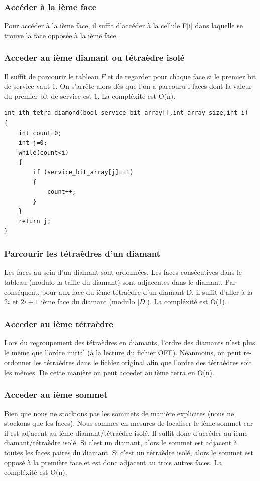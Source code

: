 \documentclass[a4paper,11pt,openany]{article}
\begin{document}
\subsubsection{Accéder à la ième face}
\noindent
Pour accéder à la ième face, il suffit d'accéder à la cellule F[i] dans laquelle se trouve la face opposée à la ième face.
\subsubsection{Acceder au ième diamant ou tétraèdre isolé}
\noindent
Il suffit de parcourir le tableau $F$ et de regarder pour chaque face si le premier bit de service vaut 1. On s'arrête alors dès que l'on a parcouru i faces dont la valeur du premier bit de service est 1. La compléxité est O(n).\\
\begin{lstlisting}
int ith_tetra_diamond(bool service_bit_array[],int array_size,int i)
{
    int count=0;
    int j=0;
    while(count<i)
    {
    	if (service_bit_array[j]==1)
    	{
    		count++;
    	}
    }
    return j;
}
\end{lstlisting}
\subsubsection{Parcourir les tétraèdres d'un diamant}
\noindent
Les faces au sein d'un diamant sont ordonnées. Les faces consécutives dans le tableau (modulo la taille du diamant) sont adjacentes dans le diamant. Par conséquent, pour aux face du ième tétraèdre d'un diamant D, il suffit d'aller à la $2i$ et $2i+1$ ième face du diamant (modulo $|D|$).
La compléxité est O(1).
\subsubsection{Acceder au ième tétraèdre}
\noindent
Lors du regroupement des tétraèdres en diamants, l'ordre des diamants n'est plus le même que l'ordre initial (à la lecture du fichier OFF). Néanmoins, on peut re-ordonner les tétraèdres dans le fichier original afin que l'ordre des tétraèdres soit les mêmes. De cette manière on peut acceder au ième tetra en O(n).
\subsubsection{Acceder au ième sommet}
\noindent
Bien que nous ne stockions pas les sommets de manière explicites (nous ne stockons que les faces). Nous sommes en mesures de localiser le ième sommet car il est adjacent au ième diamant/tétraèdre isolé.
Il suffit donc d'accéder au ième diamant/tétraèdre isolé. Si c'est un diamant, alors le sommet est adjacent à toutes les faces paires du diamant. Si c'est un tétraèdre isolé, alors le sommet est opposé à la première face et est donc adjacent au trois autres faces. La compléxité est O(n).
\end{document}
